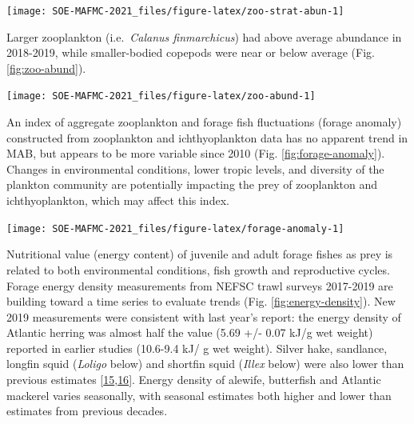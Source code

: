 \documentclass[
  10pt,
]{article}
\let\origfigure\figure
\let\endorigfigure\endfigure
\renewenvironment{figure}[1][2] {
    \expandafter\origfigure\expandafter[H]
} {
    \endorigfigure
}
\begin{document}
\begin{figure}

{\centering \texttt{[image: SOE-MAFMC-2021\_files/figure-latex/zoo-strat-abun-1]} 

}

\caption{Stratified abundance of cnidarians and euphausiids in Mid-Atlantic Bight.}\label{fig:zoo-strat-abun}
\end{figure}

Larger zooplankton (i.e.~\emph{Calanus finmarchicus}) had above average
abundance in 2018-2019, while smaller-bodied copepods were near or below
average (Fig. \ref{fig:zoo-abund}).

\begin{figure}

{\centering \texttt{[image: SOE-MAFMC-2021\_files/figure-latex/zoo-abund-1]} 

}

\caption{Large (red) and small-bodied (blue) copepod abundance in the Mid-Atlantic Bight.}\label{fig:zoo-abund}
\end{figure}

An index of aggregate zooplankton and forage fish fluctuations (forage
anomaly) constructed from zooplankton and ichthyoplankton data has no
apparent trend in MAB, but appears to be more variable since 2010 (Fig.
\ref{fig:forage-anomaly}). Changes in environmental conditions, lower
tropic levels, and diversity of the plankton community are potentially
impacting the prey of zooplankton and ichthyoplankton, which may affect
this index.

\begin{figure}

{\centering \texttt{[image: SOE-MAFMC-2021\_files/figure-latex/forage-anomaly-1]} 

}

\caption{Changes from 2000-2019 average abundance for an aggregate of 13 zooplankton and 16 ichthyoplankton groups sampled on NEFSC ECOMON surveys.}\label{fig:forage-anomaly}
\end{figure}

Nutritional value (energy content) of juvenile and adult forage fishes
as prey is related to both environmental conditions, fish growth and
reproductive cycles. Forage energy density measurements from NEFSC trawl
surveys 2017-2019 are building toward a time series to evaluate trends
(Fig. \ref{fig:energy-density}). New 2019 measurements were consistent
with last year's report: the energy density of Atlantic herring was
almost half the value (5.69 +/- 0.07 kJ/g wet weight) reported in
earlier studies (10.6-9.4 kJ/ g wet weight). Silver hake, sandlance,
longfin squid (\emph{Loligo} below) and shortfin squid (\emph{Illex}
below) were also lower than previous estimates
{[}\protect\hyperlink{ref-steimle_energy_1985}{15},\protect\hyperlink{ref-lawson_important_1998}{16}{]}.
Energy density of alewife, butterfish and Atlantic mackerel varies
seasonally, with seasonal estimates both higher and lower than estimates
from previous decades.
\end{document}

